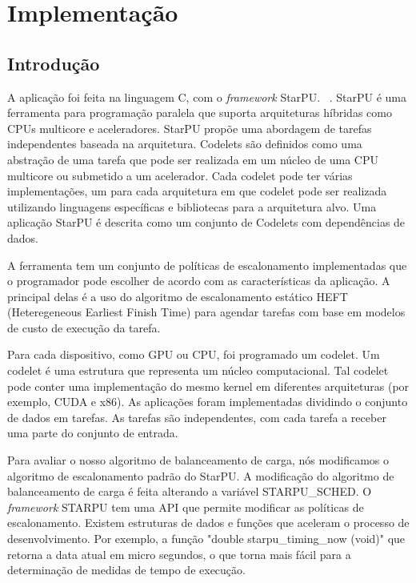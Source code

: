 \pagestyle{empty}
\cleardoublepage
\pagestyle{fancy}

\chapter{Implementação}\label{cap5}

\section{Introdução}\label{cap5:intro}

A aplicação foi feita na linguagem C, com o \emph{framework} StarPU. ~\cite{starpu}. StarPU  é uma ferramenta para programação paralela que suporta 
arquiteturas híbridas como CPUs multicore e aceleradores.  StarPU propõe 
uma abordagem de tarefas independentes baseada na arquitetura. Codelets são definidos como uma 
abstração de uma tarefa que pode ser realizada em um núcleo de uma CPU multicore ou 
submetido a um acelerador. Cada codelet pode ter várias implementações, um 
para cada arquitetura em que codelet pode ser realizada utilizando linguagens específicas 
e bibliotecas para a arquitetura alvo. Uma aplicação StarPU é descrita como  
um conjunto de Codelets com dependências de dados. 

A ferramenta tem um conjunto de políticas de escalonamento implementadas que o programador pode 
escolher de acordo com as características da aplicação. A principal delas é a 
uso do algoritmo de escalonamento estático HEFT (Heteregeneous Earliest Finish Time) para 
agendar tarefas com base em modelos de custo de execução da tarefa. 

Para cada dispositivo, como GPU ou CPU, foi programado um codelet. Um codelet é uma estrutura que representa um núcleo computacional. Tal codelet pode conter uma implementação do mesmo kernel em diferentes 
arquiteturas (por exemplo, CUDA e x86). As aplicações foram implementadas  
dividindo o conjunto de dados em tarefas. As tarefas são 
independentes, com cada tarefa a receber uma parte do conjunto de entrada. 

Para avaliar o nosso algoritmo de balanceamento de carga, nós modificamos o algoritmo de escalonamento padrão do StarPU. A modificação do algoritmo de balanceamento de carga é feita alterando a variável STARPU\_SCHED. O \emph{framework} STARPU tem uma API que permite modificar as políticas de escalonamento. Existem estruturas de dados e funções que aceleram o processo de desenvolvimento. Por exemplo, a função "double starpu\_timing\_now (void)" que retorna a data atual em micro segundos, o que torna mais fácil para a determinação de medidas de tempo de execução. 

